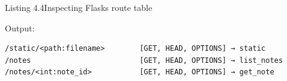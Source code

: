 \begin{codeboxcap}[short]{\textcolor{accent}{Listing 4.4}\enspace Inspecting Flask\textquotesingle s route table}

\begin{Shaded}
\begin{Highlighting}[]

\OperatorTok{=}\NormalTok{)}

\NormalTok{(}\OperatorTok{=}\NormalTok{[}\NormalTok{])}
    \NormalTok{: []\})}

\NormalTok{(}\OperatorTok{=}\NormalTok{[}\NormalTok{])}

\OperatorTok{=} 
        \NormalTok{(}\SpecialCharTok{\{}\SpecialStringTok{ [}\SpecialCharTok{\{}\SpecialCharTok{\}}\SpecialStringTok{] → }\SpecialCharTok{\{}\SpecialCharTok{\}}\NormalTok{)}
\end{Highlighting}
\end{Shaded}

\end{codeboxcap}

\noindent{}Output:

\begin{outputbox}[short]
\begin{Verbatim}[fontsize=\codesize, breaklines, breakanywhere, breaksymbolleft={\tiny\textcolor{muted}{$\hookrightarrow$}}]
/static/<path:filename>        [GET, HEAD, OPTIONS] → static
/notes                         [GET, HEAD, OPTIONS] → list_notes
/notes/<int:note_id>           [GET, HEAD, OPTIONS] → get_note
\end{Verbatim}
\end{outputbox}

